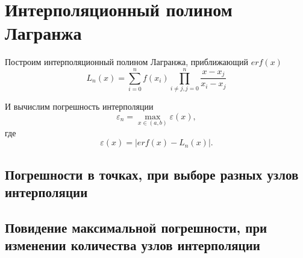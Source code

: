 \section{Интерполяционный полином Лагранжа}

Построим интерполяционный полином Лагранжа, приближающий $erf(x)$
$$
	L_n(x)=\sum\limits_{i=0}^{n}f(x_i)\prod\limits_{i \neq j, j = 0}^{n} \frac{x - x_j}{x_i-x_j}
$$

И вычислим погрешность интерполяции
$$
	\varepsilon_n = \max\limits_{x \in (a, b)} \varepsilon(x),
$$
где
$$
	\varepsilon(x)	= \left| erf(x) - L_n(x)\right|.
$$

\subsection{Погрешности в точках, при выборе разных узлов интерполяции}


\subsection{Повидение максимальной погрешности, при изменении количества узлов интерполяции}
